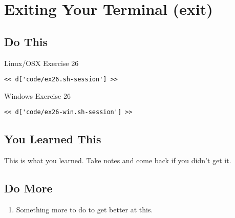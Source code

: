 \chapter{Exiting Your Terminal (exit)}

\section{Do This}

\begin{code}{Linux/OSX Exercise 26}
\begin{Verbatim}
<< d['code/ex26.sh-session'] >>
\end{Verbatim}
\end{code}

\begin{code}{Windows Exercise 26}
\begin{Verbatim}
<< d['code/ex26-win.sh-session'] >>
\end{Verbatim}
\end{code}

\section{You Learned This}

This is what you learned.  Take notes and come back if you didn't get it.

\section{Do More}

\begin{enumerate}
\item Something more to do to get better at this.
\end{enumerate}

